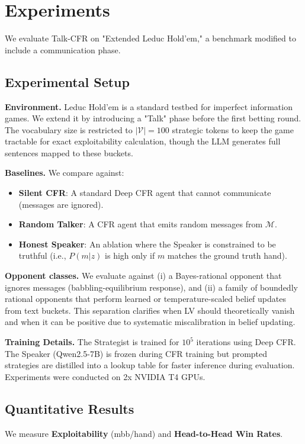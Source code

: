 \documentclass{article}
\begin{document}
\section{Experiments}
We evaluate Talk-CFR on "Extended Leduc Hold'em," a benchmark modified to include a communication phase.

\subsection{Experimental Setup}
\textbf{Environment.} Leduc Hold'em is a standard testbed for imperfect information games. We extend it by introducing a "Talk" phase before the first betting round. The vocabulary size is restricted to $|\mathcal{V}| = 100$ strategic tokens to keep the game tractable for exact exploitability calculation, though the LLM generates full sentences mapped to these buckets.

\textbf{Baselines.} We compare against:
\begin{itemize}
    \item \textbf{Silent CFR}: A standard Deep CFR agent that cannot communicate (messages are ignored).
    \item \textbf{Random Talker}: A CFR agent that emits random messages from $\mathcal{M}$.
    \item \textbf{Honest Speaker}: An ablation where the Speaker is constrained to be truthful (i.e., $P(m|z)$ is high only if $m$ matches the ground truth hand).
\end{itemize}

\textbf{Opponent classes.} We evaluate against (i) a Bayes-rational opponent that ignores messages (babbling-equilibrium response), and (ii) a family of boundedly rational opponents that perform learned or temperature-scaled belief updates from text buckets. This separation clarifies when LV should theoretically vanish and when it can be positive due to systematic miscalibration in belief updating.

\textbf{Training Details.} The Strategist is trained for $10^5$ iterations using Deep CFR. The Speaker (Qwen2.5-7B) is frozen during CFR training but prompted strategies are distilled into a lookup table for faster inference during evaluation. Experiments were conducted on 2x NVIDIA T4 GPUs.

\subsection{Quantitative Results}
We measure \textbf{Exploitability} (mbb/hand) and \textbf{Head-to-Head Win Rates}.
\end{document}
